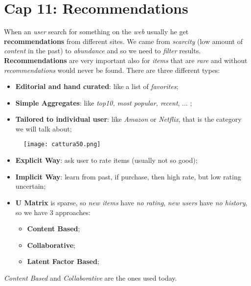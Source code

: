 \documentclass{article}
\begin{document}
\section{Cap 11: Recommendations}
When an \emph{user} search for something on the \emph{web} usually he get \textbf{recommendations} from different sites. We came from \emph{scarcity} (low amount of \emph{content} in the past) to \emph{abundance} and so we need to \emph{filter} results. \textbf{Recommendations} are very important also for \emph{items} that are \emph{rare} and without \emph{recommendations} would never be found. There are three different types:
\begin{itemize}
\item \textbf{Editorial and hand curated}: like a list of \emph{favorites};
\item \textbf{Simple Aggregates}: like \emph{top10, most popular, recent}, ... ;
\item \textbf{Tailored to individual user}: like \emph{Amazon} or \emph{Netflix}, that is the category we will talk about;
\end{itemize}
\begin{figure}[H]
  \centering
  \texttt{[image: cattura50.png]}
\end{figure}
\begin{itemize}
\item \textbf{Explicit Way}: ask user to rate items (usually not so good);
\item \textbf{Implicit Way}: learn from past, if purchase, then high rate, but low rating uncertain;
\item \textbf{U Matrix} is sparse, so \emph{new items} have \emph{no rating}, \emph{new users} have \emph{no history}, so we have 3 approaches:
\begin{itemize}
\item \textbf{Content Based};
\item \textbf{Collaborative};
\item \textbf{Latent Factor Based};
\end{itemize}
\end{itemize}
\emph{Content Based} and \emph{Collaborative} are the ones used today.
\clearpage
\end{document}
